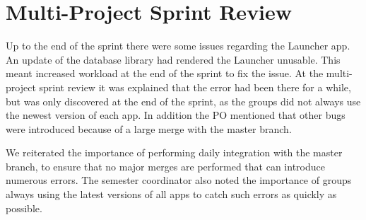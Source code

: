 \section{Multi-Project Sprint Review}\label{sec:s3_multiprj_review}
Up to the end of the sprint there were some issues regarding the Launcher app. An update of the database library had rendered the Launcher unusable. This meant increased workload at the end of the sprint to fix the issue. At the multi-project sprint review it was explained that the error had been there for a while, but was only discovered at the end of the sprint, as the \gui groups did not always use the newest version of each app. In addition the \db PO mentioned that other bugs were introduced because of a large merge with the master branch.

We reiterated the importance of performing daily integration with the master branch, to ensure that no major merges are performed that can introduce numerous errors. The semester coordinator also noted the importance of \gui groups always using the latest versions of all apps to catch such errors as quickly as possible.
